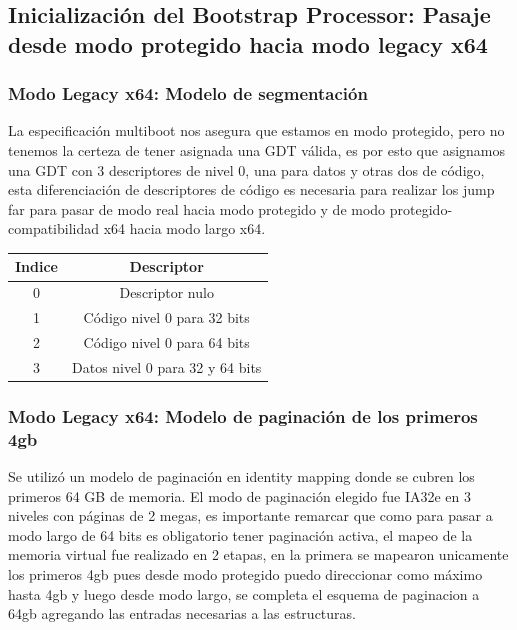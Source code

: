 \subsection{Inicialización del Bootstrap Processor: Pasaje desde modo protegido hacia modo legacy x64}
    \subsubsection{Modo Legacy x64: Modelo de segmentación}    
    La especificación multiboot nos asegura que estamos en modo protegido, pero no tenemos la certeza de tener asignada una GDT válida, es por esto que asignamos una GDT con 
    3 descriptores de nivel 0, una para datos y otras dos de código, esta diferenciación de descriptores de código es necesaria para realizar los jump far para pasar de modo real hacia modo protegido y de modo protegido-compatibilidad x64 hacia modo largo x64.

\vspace{0.5cm}
\begin{center}
    \begin{tabular}{|c|c|}
        \hline
        Indice & Descriptor\\
        \hline
        0 & Descriptor nulo\\
        \hline
        1 & Código nivel 0 para 32 bits\\
        \hline
        2 & Código nivel 0 para 64 bits\\
        \hline
        3 & Datos nivel 0 para 32 y 64 bits\\
        \hline
    \end{tabular}
\end{center}
\vspace{0.5cm}

\subsubsection{Modo Legacy x64: Modelo de paginación de los primeros 4gb}
    Se utilizó un modelo de paginación en identity mapping donde se cubren los primeros 64 GB de memoria. El modo de paginación elegido fue IA32e en 3 niveles con páginas de 2 megas, es importante remarcar que como para pasar a modo largo de 64 bits es obligatorio tener paginación activa, el mapeo de la memoria virtual fue realizado en 2 etapas, en la primera se mapearon unicamente los primeros 4gb pues desde modo protegido puedo direccionar como máximo hasta 4gb y luego desde modo largo, se completa el esquema de paginacion a 64gb agregando las entradas necesarias a las estructuras.
    \\

